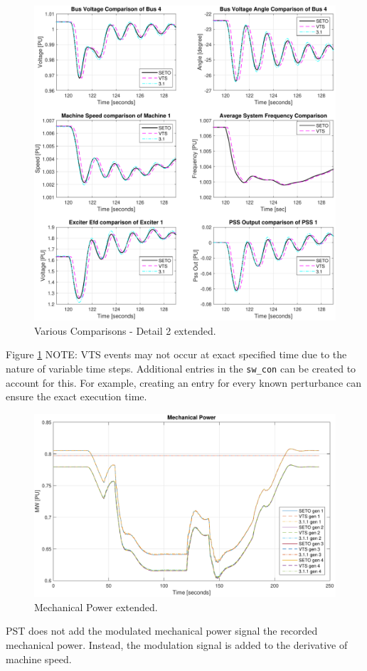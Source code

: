 \begin{figure}[H]
	\centering
	\footnotesize
	\includegraphics[width=\linewidth]{examples/extendedTerm/extended-5}
	\caption{Various Comparisons - Detail 2 extended.}
	\label{fig: extended 5}
\end{figure}%

Figure \ref{fig: extended 5} NOTE: VTS events may not occur at exact specified time due to the nature of variable time steps.
Additional entries in the \verb|sw_con| can be created to account for this.
For example, creating an entry for every known perturbance can ensure the exact execution time.


\pagebreak

\begin{figure}[H]
	\centering
	\footnotesize
	\includegraphics[width=\linewidth]{examples/extendedTerm/extended-6}
	\caption{Mechanical Power extended.}
	\label{fig: extended 6}
\end{figure}%

PST does not add the modulated mechanical power signal the recorded mechanical power.
Instead, the modulation signal is added to the derivative of machine speed.



